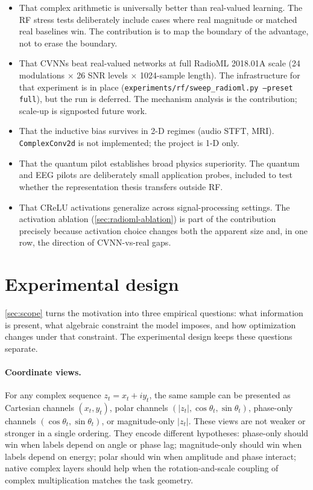 \documentclass{article}
\providecommand{\Cref}[1]{\autoref{#1}}
\newcommand{\code}[1]{\texttt{#1}}
\begin{document}
\begin{itemize}
  \item That complex arithmetic is universally better than real-valued
    learning. The RF stress tests deliberately include cases where
    real magnitude or matched real baselines win. The contribution is
    to map the boundary of the advantage, not to erase the boundary.
  \item That CVNNs beat real-valued networks at full RadioML 2018.01A
    scale (24 modulations $\times$ 26 SNR levels $\times$ 1024-sample
    length). The infrastructure for that experiment is in place
    (\code{experiments/rf/sweep\_radioml.py --preset full}), but the
    run is deferred. The mechanism analysis is the contribution;
    scale-up is signposted future work.
  \item That the inductive bias survives in 2-D regimes (audio STFT,
    MRI). \code{ComplexConv2d} is not implemented; the project is 1-D
    only.
  \item That the quantum pilot establishes broad physics superiority.
    The quantum and EEG pilots are deliberately small application
    probes, included to test whether the representation thesis
    transfers outside RF.
  \item That CReLU activations generalize across signal-processing
    settings. The activation ablation
    (\Cref{sec:radioml-ablation}) is part of the contribution
    precisely because activation choice changes both the apparent size
    and, in one row, the direction of CVNN-vs-real gaps.
\end{itemize}

\section{Experimental design}
\label{sec:framework}

\Cref{sec:scope} turns the motivation into three empirical questions:
what information is present, what algebraic constraint the model
imposes, and how optimization changes under that constraint. The
experimental design keeps these questions separate.

\paragraph{Coordinate views.}
For any complex sequence $z_t=x_t+i y_t$, the same sample can be
presented as Cartesian channels $(x_t,y_t)$, polar channels
$(|z_t|,\cos\theta_t,\sin\theta_t)$, phase-only channels
$(\cos\theta_t,\sin\theta_t)$, or magnitude-only $|z_t|$. These views
are not weaker or stronger in a single ordering. They encode different
hypotheses: phase-only should win when labels depend on angle or phase
lag; magnitude-only should win when labels depend on energy; polar
should win when amplitude and phase interact; native complex layers
should help when the rotation-and-scale coupling of complex
multiplication matches the task geometry.
\end{document}
